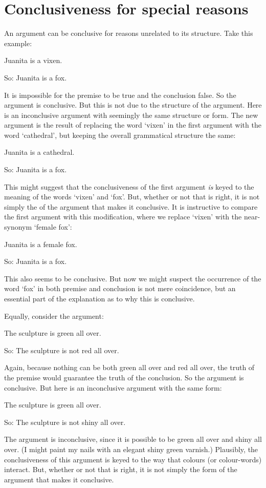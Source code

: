  \section{Conclusiveness for special reasons}
 An argument can be conclusive for reasons unrelated to its structure. Take this example:
 	\begin{earg}
 		\item[] Juanita is a vixen.
 		\item[So:] Juanita is a fox.
 	\end{earg}
 It is impossible for the premise to be true and the conclusion false. So the argument is conclusive. But this is not due to the structure of the argument. Here is an inconclusive argument with seemingly the same structure or form. The new argument is the result of replacing the word `vixen' in the first argument with the word `cathedral', but keeping the overall grammatical structure the same:
	\begin{earg}
		\item[] Juanita is a cathedral.
		\item[So:] Juanita is a fox.
	\end{earg}
This might suggest that the conclusiveness of the first argument \emph{is} keyed to the meaning of the words `vixen' and `fox'. But, whether or not that is right, it is not simply the  of the argument that makes it conclusive. It is instructive to compare the first argument with this modification, where we replace `vixen' with the near-synonym `female fox': 
\begin{earg}
 		\item[] Juanita is a female fox.
 		\item[So:] Juanita is a fox.
 	\end{earg} This also seems to be conclusive. But now we might suspect the occurrence of the word `fox' in both premise and conclusion is not mere coincidence, but an essential part of the explanation as to why this is conclusive.


Equally, consider the argument:
	\begin{earg}
		\item[] The sculpture is green all over.
		\item[So:] The sculpture is not red all over. 
	\end{earg}
Again, because nothing can be both green all over and red all over, the truth of the premise would guarantee the truth of the conclusion. So the argument is conclusive. But here is an inconclusive argument with the same form:
	\begin{earg}
		\item[] The sculpture is green all over.
		\item[So:] The sculpture is not shiny all over.
	\end{earg}
The argument is inconclusive, since it is possible to be green all over and shiny all over. (I might paint my nails with an elegant shiny green varnish.) Plausibly, the conclusiveness of this argument is keyed to the way that colours (or colour-words) interact. But, whether or not that is right, it is not simply the form of the argument that makes it conclusive. 


